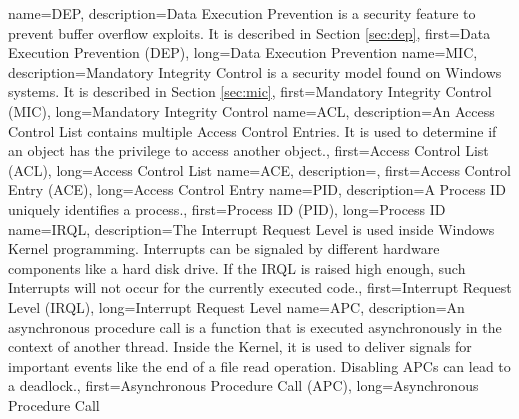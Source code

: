 {
  name={DEP},
  description={Data Execution Prevention is a security feature to prevent buffer overflow exploits. It is described in Section \ref{sec:dep}},
  first={Data Execution Prevention (DEP)},
  long={Data Execution Prevention}
}
{
  name={MIC},
  description={Mandatory Integrity Control is a security model found on Windows systems. It is described in Section \ref{sec:mic}},
  first={Mandatory Integrity Control (MIC)},
  long={Mandatory Integrity Control}
}
{
  name={ACL},
  description={An Access Control List contains multiple Access Control Entries. It is used to determine if an object has the privilege to access another object.},
  first={Access Control List (ACL)},
  long={Access Control List}
}
{
  name={ACE},
  description={},
  first={Access Control Entry (ACE)},
  long={Access Control Entry}
}
{
  name={PID},
  description={A Process ID uniquely identifies a process.},
  first={Process ID (PID)},
  long={Process ID}
}
{
  name={IRQL},
  description={The Interrupt Request Level is used inside Windows Kernel programming. Interrupts can be signaled by different hardware components like a hard disk drive. If the IRQL is raised high enough, such Interrupts will not occur for the currently executed code.},
  first={Interrupt Request Level (IRQL)},
  long={Interrupt Request Level}
}
{
  name={APC},
  description={An asynchronous procedure call is a function that is executed asynchronously in the context of another thread. Inside the Kernel, it is used to deliver signals for important events like the end of a file read operation. Disabling APCs can lead to a deadlock.},
  first={Asynchronous Procedure Call (APC)},
  long={Asynchronous Procedure Call}
}
